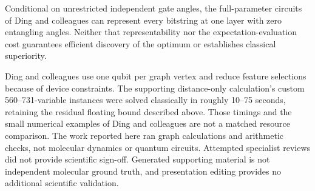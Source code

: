 \documentclass{article}
\begin{document}
Conditional on unrestricted independent gate angles, the full-parameter circuits of Ding and colleagues can represent every bitstring at one layer with zero entangling angles. Neither that representability nor the expectation-evaluation cost guarantees efficient discovery of the optimum or establishes classical superiority.\cite{P}

Ding and colleagues use one qubit per graph vertex and reduce feature selections because of device constraints.\cite{P} The supporting distance-only calculation's custom 560--731-variable instances were solved classically in roughly 10--75 seconds, retaining the residual floating bound described above. Those timings and the small numerical examples of Ding and colleagues are not a matched resource comparison. The work reported here ran graph calculations and arithmetic checks, not molecular dynamics or quantum circuits. Attempted specialist reviews did not provide scientific sign-off. Generated supporting material is not independent molecular ground truth, and presentation editing provides no additional scientific validation.



\end{document}
